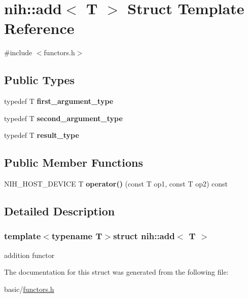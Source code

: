 \hypertarget{structnih_1_1add}{
\section{nih\-:\-:add$<$ \-T $>$ \-Struct \-Template \-Reference}
\label{structnih_1_1add}
}


{\ttfamily \#include $<$functors.\-h$>$}

\subsection*{\-Public \-Types}
\begin{DoxyCompactItemize}
\item 
\hypertarget{structnih_1_1add_aca0dbac8ae4ad35f63f15ac3ef772c7d}{
typedef \-T {\bfseries first\-\_\-argument\-\_\-type}}
\label{structnih_1_1add_aca0dbac8ae4ad35f63f15ac3ef772c7d}

\item 
\hypertarget{structnih_1_1add_a274be3a541a83d9484fea01247cef27f}{
typedef \-T {\bfseries second\-\_\-argument\-\_\-type}}
\label{structnih_1_1add_a274be3a541a83d9484fea01247cef27f}

\item 
\hypertarget{structnih_1_1add_a2ba19d328dd81e5767f39923fad31097}{
typedef \-T {\bfseries result\-\_\-type}}
\label{structnih_1_1add_a2ba19d328dd81e5767f39923fad31097}

\end{DoxyCompactItemize}
\subsection*{\-Public \-Member \-Functions}
\begin{DoxyCompactItemize}
\item 
\hypertarget{structnih_1_1add_a7a70f756c3f368ab0d0fc89b9fd85da6}{
\-N\-I\-H\-\_\-\-H\-O\-S\-T\-\_\-\-D\-E\-V\-I\-C\-E \-T {\bfseries operator()} (const \-T op1, const \-T op2) const }
\label{structnih_1_1add_a7a70f756c3f368ab0d0fc89b9fd85da6}

\end{DoxyCompactItemize}


\subsection{\-Detailed \-Description}
\subsubsection*{template$<$typename T$>$struct nih\-::add$<$ T $>$}

addition functor 

\-The documentation for this struct was generated from the following file\-:\begin{DoxyCompactItemize}
\item 
basic/\hyperlink{functors_8h}{functors.\-h}\end{DoxyCompactItemize}

